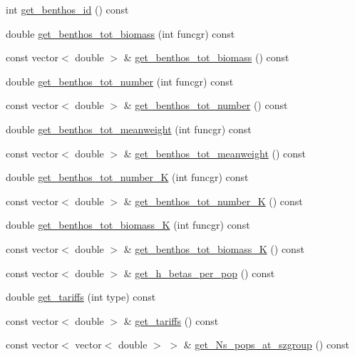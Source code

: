\begin{DoxyCompactItemize}
int \mbox{\hyperlink{class_node_a651fc83d1ae98f1432057c527edad389}{get\+\_\+benthos\+\_\+id}} () const
\item 
double \mbox{\hyperlink{class_node_a7207029294e3d4629e1fe9714896d777}{get\+\_\+benthos\+\_\+tot\+\_\+biomass}} (int funcgr) const
\item 
const vector$<$ double $>$ \& \mbox{\hyperlink{class_node_a40537e809585a28325a15e6355933b30}{get\+\_\+benthos\+\_\+tot\+\_\+biomass}} () const
\item 
double \mbox{\hyperlink{class_node_a44941fc8eed17cf2e1504da668e7669f}{get\+\_\+benthos\+\_\+tot\+\_\+number}} (int funcgr) const
\item 
const vector$<$ double $>$ \& \mbox{\hyperlink{class_node_acb5d5c175ab35aca2818c9635665ddf3}{get\+\_\+benthos\+\_\+tot\+\_\+number}} () const
\item 
double \mbox{\hyperlink{class_node_aa8c8a2072a85fdb4bdd45254e3c9d61d}{get\+\_\+benthos\+\_\+tot\+\_\+meanweight}} (int funcgr) const
\item 
const vector$<$ double $>$ \& \mbox{\hyperlink{class_node_ae8a9a7d07a588d6f91cc23c9c6f1f0af}{get\+\_\+benthos\+\_\+tot\+\_\+meanweight}} () const
\item 
double \mbox{\hyperlink{class_node_a344092f4095d761ba21ace29934b8c6e}{get\+\_\+benthos\+\_\+tot\+\_\+number\+\_\+K}} (int funcgr) const
\item 
const vector$<$ double $>$ \& \mbox{\hyperlink{class_node_ac705309f5224c74cd9517c404704a73f}{get\+\_\+benthos\+\_\+tot\+\_\+number\+\_\+K}} () const
\item 
double \mbox{\hyperlink{class_node_a157face21334697b3048d1d87ebea67f}{get\+\_\+benthos\+\_\+tot\+\_\+biomass\+\_\+K}} (int funcgr) const
\item 
const vector$<$ double $>$ \& \mbox{\hyperlink{class_node_a123c40a385fc7ea4ae162a091257d508}{get\+\_\+benthos\+\_\+tot\+\_\+biomass\+\_\+K}} () const
\item 
const vector$<$ double $>$ \& \mbox{\hyperlink{class_node_ad4de963a18ab1150e93323d3a1323200}{get\+\_\+h\+\_\+betas\+\_\+per\+\_\+pop}} () const
\item 
double \mbox{\hyperlink{class_node_a23a254d7bf21e9dfab6bcf585b27b14a}{get\+\_\+tariffs}} (int type) const
\item 
const vector$<$ double $>$ \& \mbox{\hyperlink{class_node_abe2fdaaa568757a91562e6266a7feae0}{get\+\_\+tariffs}} () const
\item 
const vector$<$ vector$<$ double $>$ $>$ \& \mbox{\hyperlink{class_node_a0689fea7fc47b2fcfbe9bff3f9532b8f}{get\+\_\+\+Ns\+\_\+pops\+\_\+at\+\_\+szgroup}} () const

\end{DoxyCompactItemize}
